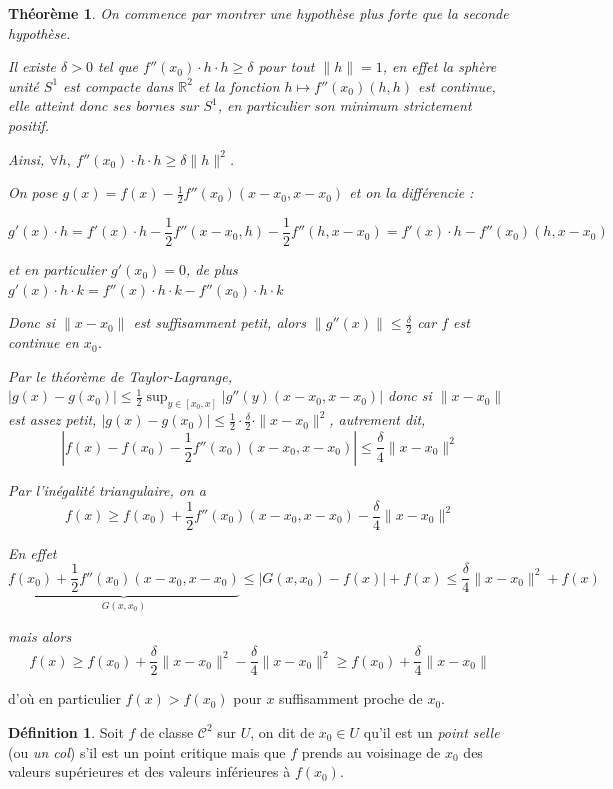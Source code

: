 \documentclass[]{article}
\newtheorem{mythm}{Théorème}
\theoremstyle{remark}
\theoremstyle{definition}
\newtheorem{mydef}{Définition}
\begin{document}
\begin{mythm}
	On commence par montrer une hypothèse plus forte que la seconde hypothèse.
	
	Il existe $\delta > 0$ tel que $f''(x_0)\cdot h \cdot h \geqslant \delta$ pour tout $\|h\| = 1$, en effet la sphère unité $S^1$ est compacte dans $\mathbb{R}^2$ et la fonction $h \mapsto f''(x_0) (h, h)$ est continue, elle atteint donc ses bornes sur $S^1$, en particulier son minimum strictement positif.
	
	Ainsi, $\forall h, ~ f''(x_0) \cdot h \cdot h \geqslant \delta \|h\|^2$.
	
	On pose $g(x) = f(x) - \frac{1}{2} f''(x_0)(x-x_0, x-x_0)$ et on la différencie :
	
	$$g'(x) \cdot h = f'(x) \cdot h - \frac{1}{2} f''(x-x_0, h) - \frac{1}{2} f''(h, x-x_0) = f'(x) \cdot h - f''(x_0)(h, x-x_0)$$
	
	et en particulier $g'(x_0) = 0$, de plus $g'(x) \cdot h \cdot k = f''(x) \cdot h \cdot k - f''(x_0) \cdot h \cdot k$
	
	Donc si $\|x-x_0\|$ est suffisamment petit, alors $\|g''(x)\| \leqslant \frac{\delta}{2}$ car $f$ est continue en $x_0$.
	
	Par le théorème de Taylor-Lagrange, $|g(x) - g(x_0)| \leqslant \frac{1}{2} \sup_{y \in [x_0, x]} |g''(y)(x-x_0, x-x_0)|$ donc si $\|x-x_0\|$ est assez petit, $|g(x) - g(x_0)| \leqslant \frac{1}{2} \cdot \frac{\delta}{2} \cdot \|x-x_0\|^2$, autrement dit, $$|f(x)-f(x_0) - \frac{1}{2}f''(x_0) (x-x_0, x-x_0)| \leqslant \frac{\delta}{4} \|x-x_0\|^2$$
	
	Par l'inégalité triangulaire, on a $$f(x) \geqslant f(x_0) + \frac{1}{2} f''(x_0)(x-x_0, x-x_0) - \frac{\delta}{4} \|x-x_0\|^2$$
	
	En effet $$\underbrace{f(x_0) + \frac{1}{2} f''(x_0) (x-x_0, x-x_0)}_{G(x, x_0)} \leqslant |G(x,x_0) - f(x)| + f(x) \leqslant \frac{\delta}{4} \|x-x_0\|^2 + f(x)$$
	
	mais alors $$f(x) \geqslant f(x_0) + \frac{\delta}{2} \|x-x_0\|^2 - \frac{\delta}{4} \|x-x_0\|^2 \geqslant f(x_0) + \frac{\delta}{4} \|x-x_0\|$$
\end{mythm}

d'où en particulier $f(x) > f(x_0)$ pour $x$ suffisamment proche de $x_0$.

\begin{mydef}
	Soit $f$ de classe $\mathcal{C}^2$ sur $U$, on dit de $x_0 \in U$ qu'il est un \textit{point selle} (ou \textit{un col}) s'il est un point critique mais que $f$ prends au voisinage de $x_0$ des valeurs supérieures et des valeurs inférieures à $f(x_0)$.
\end{mydef}
\end{document}
